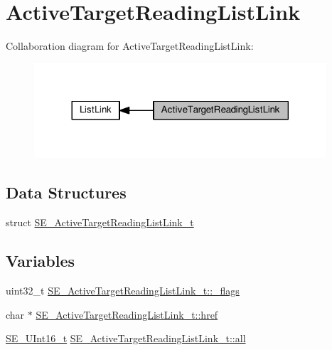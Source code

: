 \hypertarget{group__ActiveTargetReadingListLink}{}\section{Active\+Target\+Reading\+List\+Link}
\label{group__ActiveTargetReadingListLink}
Collaboration diagram for Active\+Target\+Reading\+List\+Link\+:\nopagebreak
\begin{figure}[H]
\begin{center}
\leavevmode
\includegraphics[width=308pt]{group__ActiveTargetReadingListLink}
\end{center}
\end{figure}
\subsection*{Data Structures}
\begin{DoxyCompactItemize}
\item 
struct \hyperlink{structSE__ActiveTargetReadingListLink__t}{S\+E\+\_\+\+Active\+Target\+Reading\+List\+Link\+\_\+t}
\end{DoxyCompactItemize}
\subsection*{Variables}
\begin{DoxyCompactItemize}
\item 
uint32\+\_\+t \hyperlink{group__ActiveTargetReadingListLink_ga40bd728c6927ba6addca7bee573a5386}{S\+E\+\_\+\+Active\+Target\+Reading\+List\+Link\+\_\+t\+::\+\_\+flags}
\item 
char $\ast$ \hyperlink{group__ActiveTargetReadingListLink_ga48381c17bdb45f1d5529dcf34049108d}{S\+E\+\_\+\+Active\+Target\+Reading\+List\+Link\+\_\+t\+::href}
\item 
\hyperlink{group__UInt16_gac68d541f189538bfd30cfaa712d20d29}{S\+E\+\_\+\+U\+Int16\+\_\+t} \hyperlink{group__ActiveTargetReadingListLink_gacaadf42bb01e65b4e8b1c76df59e38af}{S\+E\+\_\+\+Active\+Target\+Reading\+List\+Link\+\_\+t\+::all}
\end{DoxyCompactItemize}


